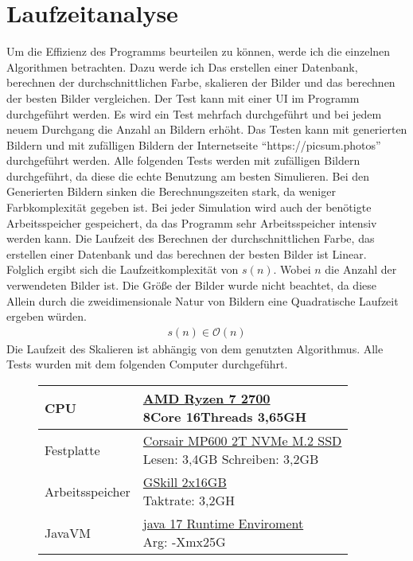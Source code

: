 \section{Laufzeitanalyse}
Um die Effizienz des Programms beurteilen zu können, werde ich die einzelnen Algorithmen betrachten. Dazu werde ich Das erstellen einer Datenbank, berechnen der durchschnittlichen Farbe, skalieren der Bilder und das berechnen der besten Bilder vergleichen. Der Test kann mit einer UI im Programm durchgeführt werden. Es wird ein Test mehrfach durchgeführt und bei jedem neuem Durchgang die Anzahl an Bildern erhöht. Das Testen kann mit generierten Bildern und mit zufälligen Bildern der Internetseite ``https://picsum.photos'' durchgeführt werden. Alle folgenden Tests werden mit zufälligen Bildern durchgeführt, da diese die echte Benutzung am besten Simulieren. Bei den Generierten Bildern sinken die Berechnungszeiten stark, da weniger Farbkomplexität gegeben ist. Bei jeder Simulation wird auch der benötigte Arbeitsspeicher gespeichert, da das Programm sehr Arbeitsspeicher intensiv werden kann. Die Laufzeit des Berechnen der durchschnittlichen Farbe, das erstellen einer Datenbank und das berechnen der besten Bilder ist Linear. Folglich ergibt sich die Laufzeitkomplexität von $s(n)$. Wobei $n$ die Anzahl der verwendeten Bilder ist. Die Größe der Bilder wurde nicht beachtet, da diese Allein durch die zweidimensionale Natur von Bildern eine Quadratische Laufzeit ergeben würden.
\begin{align}
    s(n) \in \mathcal{O}(n)
\end{align}
Die Laufzeit des Skalieren ist abhängig von dem genutzten Algorithmus.
\bigskip
\newline
Alle Tests wurden mit dem folgenden Computer durchgeführt.
\begin{figure}[h]
    \centering
    \begin{tabular}{| l | l |}
        \hline
        CPU             & \makecell[l]{\underline{AMD Ryzen 7 2700} \\ 8Core 16Threads 3,65GH}\\
        \hline
        Festplatte      & \makecell[l]{\underline{Corsair MP600 2T NVMe M.2 SSD} \\ Lesen: 3,4GB Schreiben: 3,2GB}\\
        \hline
        Arbeitsspeicher & \makecell[l]{\underline{GSkill 2x16GB} \\ Taktrate: 3,2GH}\\
        \hline
        JavaVM          & \makecell[l]{\underline{java 17 Runtime Enviroment} \\ Arg: -Xmx25G}\\
        \hline
    \end{tabular}
\end{figure}

